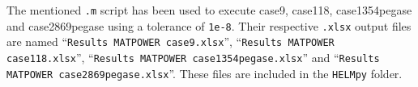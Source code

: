 \documentclass[12pt]{article}
\begin{document}
The mentioned \texttt{.m} script has been used to execute case9, case118, case1354pegase and case2869pegase using a tolerance of \texttt{1e-8}. Their respective \texttt{.xlsx} output files are named ``\texttt{Results MATPOWER case9.xlsx}'', ``\texttt{Results MATPOWER case118.xlsx}'', ``\texttt{Results MATPOWER case1354pegase.xlsx}'' and ``\texttt{Results MATPOWER case2869pegase.xlsx}''. These files are included in the \texttt{HELMpy} folder.



\nocite{*}

\end{document}
